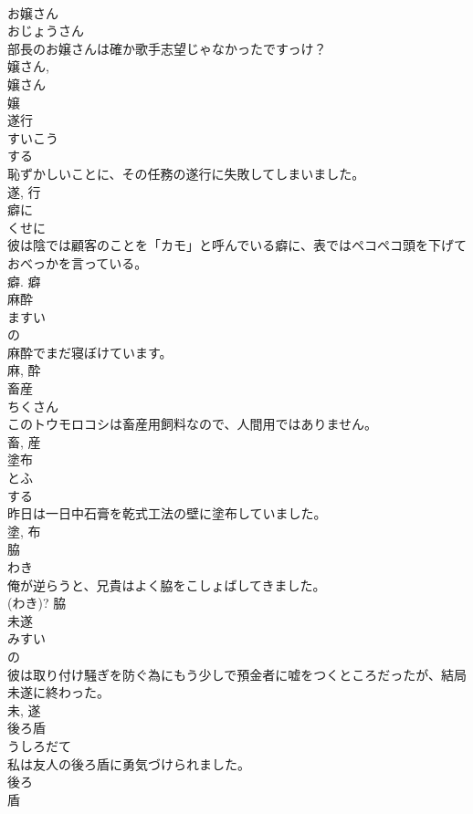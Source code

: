 \documentclass[8pt]{extreport}
\begin{document}
\begin{CJK}{UTF8}{min}
\\	お嬢さん	
\\	おじょうさん	
\\	部長のお嬢さんは確か歌手志望じゃなかったですっけ？	
\\	嬢さん, 
\\	嬢さん 
\\	嬢	
\\	遂行	
\\	すいこう	
\\	する 
\\	恥ずかしいことに、その任務の遂行に失敗してしまいました。	
\\	遂, 行	
\\	癖に	
\\	くせに	
\\	彼は陰では顧客のことを「カモ」と呼んでいる癖に、表ではペコペコ頭を下げておべっかを言っている。	
\\	癖.	癖	
\\	麻酔	
\\	ますい	
\\	の 
\\	麻酔でまだ寝ぼけています。	
\\	麻, 酔	
\\	畜産	
\\	ちくさん	
\\	このトウモロコシは畜産用飼料なので、人間用ではありません。	
\\	畜, 産	
\\	塗布	
\\	とふ	
\\	する 
\\	昨日は一日中石膏を乾式工法の壁に塗布していました。	
\\	塗, 布	
\\	脇	
\\	わき	
\\	俺が逆らうと、兄貴はよく脇をこしょばしてきました。	
\\	(わき)?	脇	
\\	未遂	
\\	みすい	
\\	の 
\\	彼は取り付け騒ぎを防ぐ為にもう少しで預金者に嘘をつくところだったが、結局未遂に終わった。	
\\	未, 遂	
\\	後ろ盾	
\\	うしろだて	
\\	私は友人の後ろ盾に勇気づけられました。	
\\	後ろ 
\\	盾 

\end{CJK}
\end{document}
